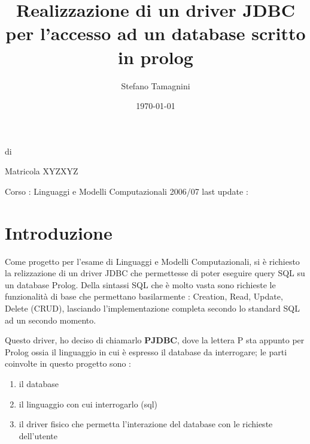 \documentclass[a4paper,titlepage,12pt]{article}	%
\title{Realizzazione di un driver JDBC per l'accesso ad un database scritto in prolog}
\author{Stefano Tamagnini}
\date{\today}
\makeatletter
\def\maketitle{%
  \null
  \thispagestyle{empty}%
  \vfill
  \begin{center}\leavevmode
    \normalfont
    {\huge \raggedright \@title \par}%
    \hrulefill \par
    di {\LARGE \raggedleft \@author \par }%
    {\raggedleft Matricola XYZXYZ \par}%
    \vskip 3cm
    Corso : Linguaggi e Modelli Computazionali 2006/07
    \vskip 1cm
    last update : { \@date\par}%
  \end{center}%
  \vfill
  \null
  \cleardoublepage
  }
\makeatother
\begin{document}
\maketitle

\tableofcontents

\newpage

\section{Introduzione}

Come progetto per l'esame di Linguaggi e Modelli Computazionali, si è richiesto la relizzazione di un driver JDBC che permettesse di poter eseguire query SQL su un database Prolog. Della sintassi SQL che è molto vasta sono richieste le funzionalità di base che permettano basilarmente : Creation, Read, Update, Delete (CRUD), lasciando l'implementazione completa secondo lo standard SQL ad un secondo momento.
\par 
Questo driver, ho deciso di chiamarlo {\bf PJDBC}, dove la lettera P sta appunto per Prolog ossia il linguaggio in cui è espresso il database da interrogare; le parti coinvolte in questo progetto sono : 
\begin{enumerate}
\item il database
\item il linguaggio con cui interrogarlo (sql)
\item il driver fisico che permetta l'interazione del database con le richieste dell'utente
\end{enumerate}






	
\end{document}
